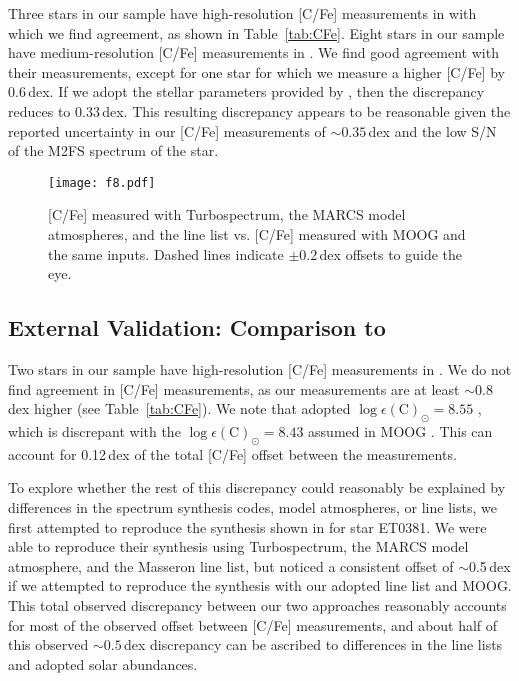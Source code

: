 \documentclass{emulateapj-rtx4}
\begin{document}
Three stars in our sample have high-resolution [C/Fe] measurements in \citet{sjf+15}
with which we find agreement, as shown in Table~\ref{tab:CFe}.  Eight stars in our sample 
have medium-resolution [C/Fe] measurements in \citet{kgz+15}.
We find good agreement with their measurements, except for one star for which we measure 
a higher [C/Fe] by 0.6\,dex. If we adopt the stellar parameters provided by \citet{kgz+15}, then the
discrepancy reduces to 0.33\,dex. This resulting discrepancy appears to be reasonable given the
reported uncertainty in our [C/Fe] measurements of $\sim0.35\,$dex and the low S/N of the M2FS spectrum of the star.


\begin{figure}[!t]
\centering
\texttt{[image: f8.pdf]}
\caption{[C/Fe] measured with Turbospectrum, the MARCS model
atmospheres, and the \citet{mpv+14} line list vs. [C/Fe] measured with MOOG and the same inputs. 
Dashed lines indicate $\pm0.2\,$dex offsets to guide the eye.}
\label{fig:SynthCompare}
\end{figure}


\subsection{External Validation: Comparison to \citet{jnm+15}}
\label{sec:jabcfe}
Two stars in our sample have high-resolution [C/Fe] measurements in \citet{jnm+15}.
We do not find agreement in [C/Fe] measurements, as our measurements are
at least $\sim0.8\,$dex higher (see Table~\ref{tab:CFe}). 
We note that \citet{jnm+15} adopted $\log\epsilon(\text{C})_{\odot} =  8.55$ \citep{ag+89, gs+98}, which is discrepant 
with the $\log\epsilon(\text{C})_{\odot} =  8.43$ assumed in MOOG \citep{ags+09}. 
This can account for 0.12\,dex of the total [C/Fe] offset between the measurements.

To explore whether the rest of this discrepancy could reasonably be explained by differences in the spectrum 
synthesis codes, model atmospheres, or line lists, we first attempted to reproduce the synthesis 
shown in \citet{jnm+15} for star ET0381. 
We were able to reproduce their synthesis using Turbospectrum, the MARCS model atmosphere, and the Masseron line list, but noticed a consistent offset of $\sim$0.5\,dex if we attempted to reproduce the synthesis with our adopted line list and MOOG.
This total observed discrepancy between our two approaches reasonably accounts for most of the observed
offset between [C/Fe] measurements, and about half of this observed $\sim0.5\,$dex discrepancy can be 
ascribed to differences in the line lists and adopted solar abundances.
\end{document}
